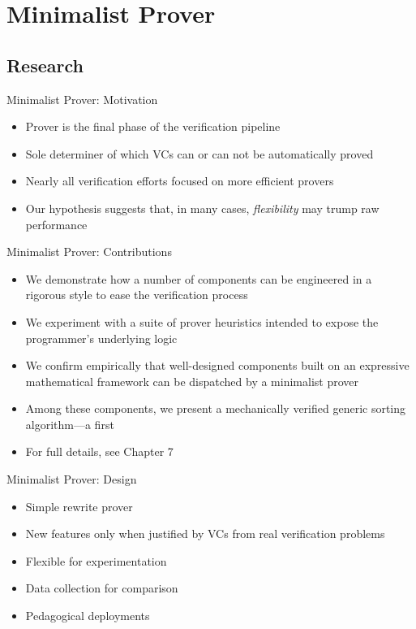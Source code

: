 \section{Minimalist Prover}

\subsection{Research}
\begin{frame}{Minimalist Prover: Motivation}
	\begin{itemize}
		\item Prover is the final phase of the verification pipeline
		\item Sole determiner of which VCs can or can not be automatically proved
		\item Nearly all verification efforts focused on more efficient provers
		\item Our hypothesis suggests that, in many cases, \emph{flexibility} may trump raw performance
	\end{itemize}
\end{frame}

\begin{frame}{Minimalist Prover: Contributions}
	\begin{itemize}
		\item We demonstrate how a number of components can be engineered in a rigorous style to ease the verification process
		\item We experiment with a suite of prover heuristics intended to expose the programmer's underlying logic
		\item We confirm empirically that well-designed components built on an expressive mathematical framework can be dispatched by a minimalist prover
		\item Among these components, we present a mechanically verified generic sorting algorithm---a first
		\item For full details, see Chapter 7
	\end{itemize}
\end{frame}

\begin{frame}{Minimalist Prover: Design}
	\begin{itemize}
		\item Simple rewrite prover
		\item New features only when justified by VCs from real verification problems
		\item Flexible for experimentation
		\item Data collection for comparison
		\item Pedagogical deployments
	\end{itemize}
\end{frame}


